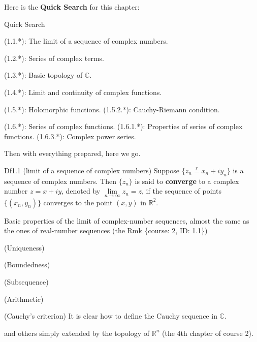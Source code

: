 \documentclass{article}
\begin{document}
Here is the \textbf{Quick Search} for this chapter:
\begin{Th}{Quick Search}
    \begin{compactdesc}
        \item (1.1.*): The limit of a sequence of complex numbers.
        \item (1.2.*): Series of complex terms.
        \item (1.3.*): Basic topology of $\mathbb{C}$.
        \item (1.4.*): Limit and continuity of complex functions.
        \item (1.5.*): Holomorphic functions.
            \subitem (1.5.2.*): Cauchy-Riemann condition.
        \item (1.6.*): Series of complex functions.
            \subitem (1.6.1.*): Properties of series of complex functions.
            \subitem (1.6.3.*): Complex power series.
    \end{compactdesc}
\end{Th}

Then with everything prepared, here we go. 

\begin{Df}{Df1.1 (limit of a sequence of complex numbers)}
    Suppose $\{z_n \overset{r}{=} x_n+iy_n\}$ is a sequence of complex numbers. Then $\{z_n\}$ is said to \textbf{converge} to a complex number $z = x+iy$, denoted by $\lim\limits_{n\to\infty} z_n = z$, if the sequence of points $\{(x_n, y_n)\}$ converges to the point $(x, y)$ in $\mathbb{R}^2$.
\end{Df}

\begin{Rmk}{}
    \textcolor{Th}{Basic properties of the limit of complex-number sequences, almost the same as the ones of real-number sequences (the Rmk \{course: 2, ID: 1.1\})
    \begin{compactenum}
        \item (Uniqueness)
        \item (Boundedness)
        \item (Subsequence)
        \item (Arithmetic)
        \item (Cauchy's criterion) \textcolor{Df}{It is clear how to define the Cauchy sequence in $\mathbb{C}$.}
    \end{compactenum}}
    and others simply extended by the topology of $\mathbb{R}^n$ (the 4th chapter of course 2).
\end{Rmk}
\end{document}
